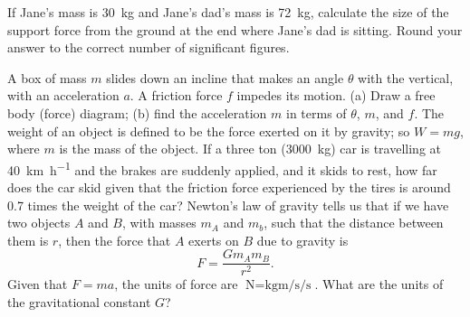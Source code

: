 \documentclass[a4paper]{exam}
\begin{document}
\begin{questions}
\begin{parts}
              If Jane's mass is \SI{30}{\kilo\gram} and Jane's dad's mass is \SI{72}{\kilo\gram}, calculate the
              size of the support force from the ground at the end where Jane's dad is sitting. Round your answer
              to the correct number of significant figures.
      \end{parts}
    \question A box of mass $ m $ slides down an incline that makes an angle $ \theta $ with the vertical, with an acceleration $ a $.
              A friction force $ f $ impedes its motion. (a) Draw a free body (force) diagram; (b) find the acceleration $ m $
              in terms of $ \theta $, $ m $, and $ f $.
    \question The weight of an object is defined to be the force exerted on it by gravity; so $ W = mg $, where $ m $ is the
              mass of the object. If a three ton (\SI{3000}{\kilo\gram}) car is travelling at \SI{40}{\kilo\metre\per\hour}
              and the brakes are suddenly applied, and it skids to rest, how far does the car skid given that the friction
              force experienced by the tires is around 0.7 times the weight of the car?
    \question Newton's law of gravity tells us that if we have two objects $ A $ and $ B $, with masses $ m_A $ and $ m_b $,
              such that the distance between them is $ r $, then the force that $ A $ exerts on $ B $ due to gravity is
              \begin{displaymath}
                F = \frac{Gm_A m_B}{r^2}.
              \end{displaymath}
              Given that $ F = ma $, the units of force are $ \si{\newton} = \si{\kilo\gram\metre\per\second\per\second} $. What
              are the units of the gravitational constant $ G $?
  \end{questions}
\end{document}
